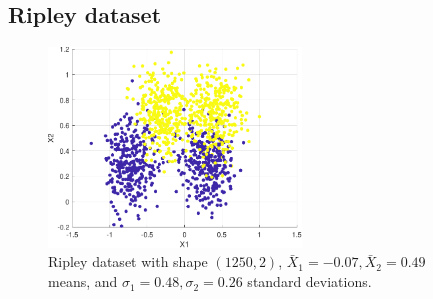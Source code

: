 \documentclass{article}
\begin{document}
    \subsection{Ripley dataset} 
        \begin{figure}
            \centering
            \includegraphics[width=0.60\textwidth]{Assignment 1/figures/ripley_data.pdf}
            \caption{Ripley dataset with shape $(1250,2)$, $\bar{X}_1=-0.07, \bar{X}_2=0.49$ means, and $ \sigma_1=0.48, \sigma_2=0.26$ standard deviations. }
            \label{fig:two_gaussians}
        \end{figure}
        
\end{document}
